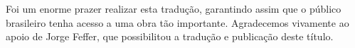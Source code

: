 
Foi um enorme prazer realizar esta tradução, garantindo assim que o
público brasileiro tenha acesso a uma obra tão importante. Agradecemos vivamente ao apoio de Jorge Feffer, que possibilitou a
tradução e publicação deste título.
